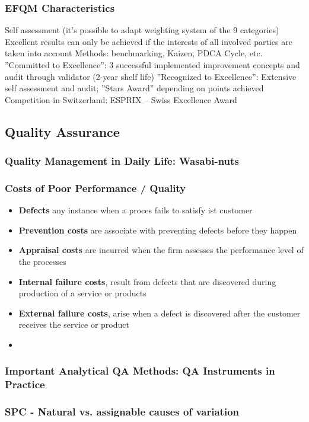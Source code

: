 \subsubsection{EFQM Characteristics }
Self assessment (it’s possible to adapt weighting system
of the 9 categories)
Excellent results can only be achieved if the interests of all
involved parties are taken into account
Methods: benchmarking, Kaizen, PDCA Cycle, etc.
''Committed to Excellence'': 3 successful implemented
improvement concepts and audit through validator (2-year
shelf life)
''Recognized to Excellence'': Extensive self assessment and
audit; ''Stars Award'' depending on points achieved
Competition in Switzerland: ESPRIX – Swiss Excellence
Award
\subsection{Quality Assurance}
\subsubsection{Quality Management in Daily Life: Wasabi-nuts}
\subsubsection{Costs of Poor Performance / Quality}
\begin{itemize}
	\item \textbf{Defects} any instance when a proces fails to satisfy ist customer
	\item \textbf{Prevention costs} are associate with preventing defects before they happen
	\item \textbf{Appraisal costs} are incurred when the firm assesses the performance level of the processes
	\item \textbf{Internal failure costs}, result from defects that are discovered during production of a service or products
	\item \textbf{External failure costs}, arise when a defect is discovered after the customer receives the service or product
\item
\end{itemize}
\subsubsection{Important Analytical QA Methods: QA Instruments in Practice }
\subsubsection{SPC - Natural vs. assignable causes of variation}

